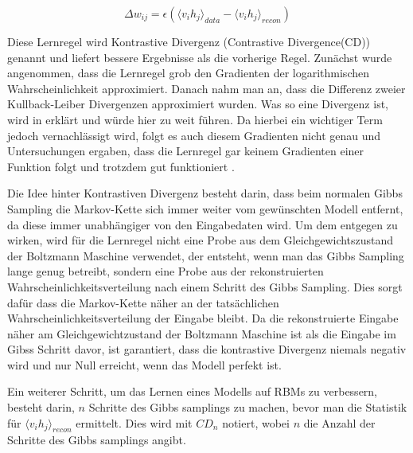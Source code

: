 \documentclass[12pt]{article}
\begin{document}
\begin{equation}
\Delta w_{ij} = \epsilon \left( \langle v_i h_j\rangle_{data} - \langle v_i h_j \rangle_{recon}\right)
\end{equation}

Diese Lernregel wird Kontrastive Divergenz (Contrastive Divergence(CD)) genannt und liefert bessere Ergebnisse als die vorherige Regel. Zunächst wurde angenommen, dass die  Lernregel grob den Gradienten der logarithmischen Wahrscheinlichkeit approximiert. Danach nahm man an, dass die Differenz zweier Kullback-Leiber Divergenzen approximiert wurden. Was so eine Divergenz ist, wird in \cite{KLD} erklärt und würde hier zu weit führen. Da hierbei ein wichtiger Term jedoch vernachlässigt wird, folgt es auch diesem Gradienten nicht genau und Untersuchungen ergaben, dass die Lernregel gar keinem Gradienten einer Funktion folgt und trotzdem gut funktioniert \cite{noconv}. 

Die Idee hinter Kontrastiven Divergenz besteht darin, dass beim normalen Gibbs Sampling die Markov-Kette sich immer weiter vom gewünschten Modell entfernt, da diese immer unabhängiger von den Eingabedaten wird. Um dem entgegen zu wirken, wird für die Lernregel nicht eine Probe aus dem Gleichgewichtszustand der Boltzmann Maschine verwendet, der entsteht, wenn man das Gibbs Sampling lange genug betreibt, sondern eine Probe aus der rekonstruierten Wahrscheinlichkeitsverteilung nach einem Schritt des Gibbs Sampling. Dies sorgt dafür dass die Markov-Kette näher an der tatsächlichen Wahrscheinlichkeitsverteilung der Eingabe bleibt. Da die rekonstruierte Eingabe näher am Gleichgewichtzustand der Boltzmann Maschine ist als die Eingabe im Gibss Schritt davor, ist garantiert, dass die kontrastive Divergenz niemals negativ wird und nur Null erreicht, wenn das Modell perfekt ist. \cite{digits}

Ein weiterer Schritt, um das Lernen eines Modells auf RBMs zu verbessern, besteht darin, $n$ Schritte des Gibbs samplings zu machen, bevor man die Statistik für $\langle v_i h_j \rangle_{recon}$ ermittelt. Dies wird mit $CD_n$ notiert, wobei $n$ die Anzahl der Schritte des Gibbs samplings angibt.
\end{document}
